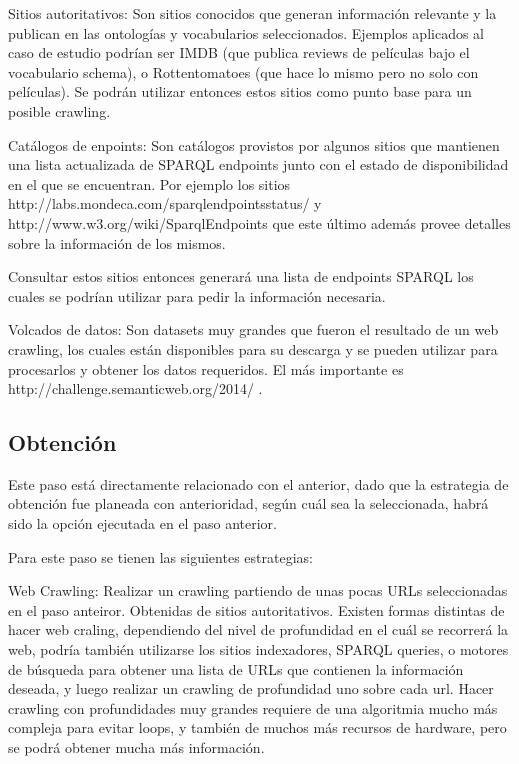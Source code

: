 Sitios autoritativos: Son sitios conocidos que generan información relevante y la publican en las ontologías y vocabularios 
seleccionados. Ejemplos aplicados al caso de estudio podrían ser IMDB (que publica reviews de películas bajo el vocabulario schema), o Rottentomatoes
(que hace lo mismo pero no solo con películas). Se podrán utilizar entonces estos sitios como punto base para un posible crawling.

Catálogos de enpoints: Son catálogos provistos por algunos sitios que mantienen una lista actualizada de SPARQL endpoints 
junto con el estado de disponibilidad en el que se encuentran. Por ejemplo los sitios http://labs.mondeca.com/sparqlendpointsstatus/ y 
http://www.w3.org/wiki/SparqlEndpoints que este último además provee detalles sobre la información de los mismos.

Consultar estos sitios entonces generará una lista de endpoints SPARQL los cuales se podrían utilizar para pedir la información necesaria.

Volcados de datos: Son datasets muy grandes que fueron el resultado de un web crawling, los cuales están disponibles para su descarga 
y se pueden utilizar para procesarlos y obtener los datos requeridos. El más importante es http://challenge.semanticweb.org/2014/ .

\subsection{Obtención}

Este paso está directamente relacionado con el anterior, dado que la estrategia de obtención fue planeada con anterioridad, según 
cuál sea la seleccionada, habrá sido la opción ejecutada en el paso anterior.

Para este paso se tienen las siguientes estrategias:

Web Crawling: Realizar un crawling partiendo de unas pocas URLs seleccionadas en el paso anteiror. Obtenidas de sitios autoritativos.
Existen formas distintas de hacer web craling, dependiendo del nivel de profundidad en el cuál se recorrerá la web, podría también utilizarse los 
sitios indexadores, SPARQL queries, o motores de búsqueda para obtener una lista de URLs que contienen la información deseada, y luego realizar un crawling de profundidad uno sobre cada url.
Hacer crawling con profundidades muy grandes requiere de una algoritmia mucho más compleja para evitar loops, y también de muchos más recursos de hardware, pero se podrá obtener mucha más información.

